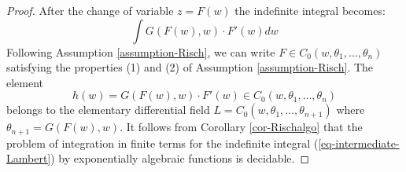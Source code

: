 \documentclass[12pt]{amsart}
\theoremstyle{definition}
\theoremstyle{plain}
\theoremstyle{exampstyle}\newtheorem{thmx}{Theorem}
\theoremstyle{exampstyle}\newtheorem{thmxbis}{Theorem}
\begin{document}
\begin{proof} 
After the change of variable $z = F(w)$ the indefinite integral becomes: 
\begin{equation} \label{eq-intermediate-Lambert}
\int G(F(w),w) \cdot F'(w) dw 
\end{equation}
Following Assumption \ref{assumption-Risch}, we can write $F \in C_0(w, \theta_1,\ldots, \theta_n)$ satisfying the properties (1) and (2) of Assumption  \ref{assumption-Risch}. The element
$$ h(w) = G(F(w),w) \cdot F'(w) \in C_0(w, \theta_1,\ldots, \theta_n)$$ 
belongs to the elementary differential field $L = C_0(w, \theta_1,\ldots, \theta_{n+1})$ where $\theta_{n + 1} = G(F(w),w)$. It follows from Corollary \ref{cor-Rischalgo} that the problem of integration in finite terms for the indefinite integral (\ref{eq-intermediate-Lambert}) by exponentially algebraic functions is decidable. 


\end{proof}
\end{document}
